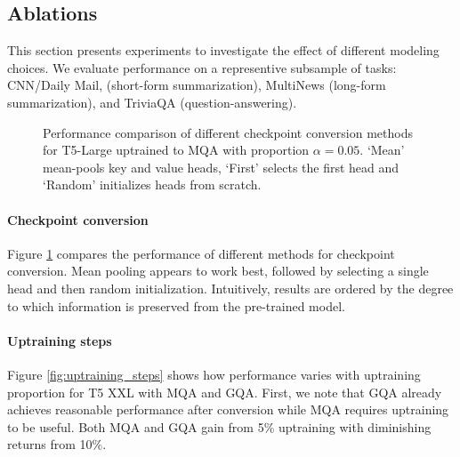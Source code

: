 \documentclass[11pt]{article}
\newcommand{\mq}{\textsc{MQA}\xspace}
\newcommand{\gmq}{\textsc{GQA}\xspace}
\begin{document}
\subsection{Ablations}

This section presents experiments to investigate the effect of different modeling choices. We evaluate performance on a representive subsample of tasks: CNN/Daily Mail, (short-form summarization), MultiNews (long-form summarization), and TriviaQA (question-answering).
\begin{figure}[h]
\centering
\hspace{-0.5cm}
    \caption{Performance comparison of different checkpoint conversion methods for T5-Large uptrained to \mq with proportion $\alpha=0.05$. `Mean' mean-pools key and value heads, `First' selects the first head and `Random' initializes heads from scratch.}
    \label{fig:conversion_methods}
\end{figure}

\paragraph{Checkpoint conversion}
Figure \ref{fig:conversion_methods} compares the performance of different methods for checkpoint conversion. Mean pooling appears to work best, followed by selecting a single head and then random initialization. Intuitively, results are ordered by the degree to which information is preserved from the pre-trained model.

\paragraph{Uptraining steps}
Figure \ref{fig:uptraining_steps} shows how performance varies with uptraining proportion for T5 XXL with \mq and \gmq. First, we note that \gmq already achieves reasonable performance after conversion while \mq requires uptraining to be useful. Both \mq and \gmq gain from 5\% uptraining with diminishing returns from 10\%.
\end{document}
